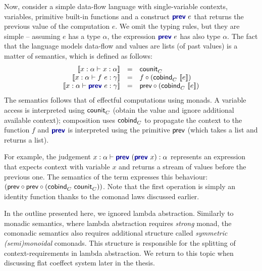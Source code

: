 Now, consider a simple data-flow language with single-variable contexts, variables, 
primitive built-in functions and a construct $\kvd{prev}~e$ that returns the previous
value of the computation $e$. We omit the typing rules, but they are simple -- assuming $e$ 
has a type $\alpha$, the expression $\kvd{prev}~e$ has also type $\alpha$. The fact that
the language models data-flow and values are lists (of past values) is a matter of semantics,
which is defined as follows:
%
\begin{equation*}
\begin{array}{rcl}
\sem{x:\alpha \vdash x : \alpha} &=& \ident{counit}_\ctyp{}{}\\
\sem{x:\alpha \vdash f~e : \gamma} &=& f \circ (\ident{cobind}_\ctyp{}{} ~\sem{e})\\
\sem{x:\alpha \vdash \kvd{prev}~e : \gamma} &=& \ident{prev} \circ (\ident{cobind}_\ctyp{}{} ~\sem{e})\\
\end{array}
\end{equation*}
%
The semantics follows that of effectful computations using monads. A variable access is interpreted
using $\textnormal{\sffamily counit}_C^{}$ (obtain the value and ignore additional available context); composition
uses $\textnormal{\sffamily cobind}_C^{}$ to propagate the context to the function $f$ and $\kvd{prev}$
is interpreted using the primitive $\textnormal{\sffamily prev}$ (which takes a list and returns a list).

For example, the judgement $x:\alpha \vdash \kvd{prev}~(\kvd{prev}~x) : \alpha$ represents an 
expression that expects context with variable $x$ and returns a stream of values before the 
previous one. The semantics of the term expresses this behaviour: 
$(\textnormal{\sffamily prev} \circ \textnormal{\sffamily prev} \circ (\textnormal{\sffamily cobind}_C^{}~\textnormal{\sffamily counit}_C^{}))$.
Note that the first operation is simply an identity function thanks to the comonad laws discussed 
earlier.

In the outline presented here, we ignored lambda abstraction. Similarly to monadic semantics,
where lambda abstraction requires \emph{strong} monad, the comonadic semantics also requires
additional structure called \emph{symmetric (semi)monoidal} comonads. This structure is 
responsible for the splitting of context-requirements in lambda abstraction. We return to this
topic when discussing flat coeffect system later in the thesis.


